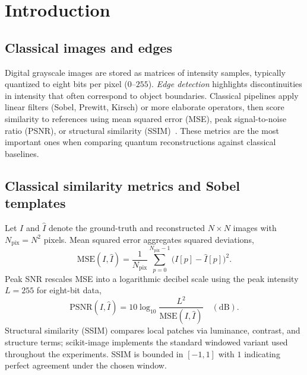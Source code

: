 \chapter{Introduction}\label{ch:introduction}
\thispagestyle{pagestyle}

\section{Classical images and edges}
Digital grayscale images are stored as matrices of intensity samples, typically quantized to eight bits per pixel ($0$--$255$). \emph{Edge detection} highlights discontinuities in intensity that often correspond to object boundaries. Classical pipelines apply linear filters (Sobel, Prewitt, Kirsch) or more elaborate operators, then score similarity to references using mean squared error (MSE), peak signal-to-noise ratio (PSNR), or structural similarity (SSIM)~\cite{Zhang2015QSobel,Zhou2019PrewittNEQR,Xu2020Kirsch}. These metrics are the most important ones when comparing quantum reconstructions against classical baselines.

\section{Classical similarity metrics and Sobel templates}
Let $I$ and $\hat{I}$ denote the ground-truth and reconstructed $N\times N$ images with $N_{\mathrm{pix}}=N^2$ pixels. Mean squared error aggregates squared deviations,
\begin{equation}
\mathrm{MSE}(I,\hat{I}) = \frac{1}{N_{\mathrm{pix}}}\sum_{p=0}^{N_{\mathrm{pix}}-1}\bigl(I[p]-\hat{I}[p]\bigr)^2 .
\end{equation}
Peak SNR rescales MSE into a logarithmic decibel scale using the peak intensity $L=255$ for eight-bit data,
\begin{equation}
\mathrm{PSNR}(I,\hat{I}) = 10\log_{10}\frac{L^2}{\mathrm{MSE}(I,\hat{I})}\quad(\mathrm{dB}).
\end{equation}
Structural similarity (SSIM) compares local patches via luminance, contrast, and structure terms; scikit-image implements the standard windowed variant used throughout the experiments. SSIM is bounded in $[-1,1]$ with $1$ indicating perfect agreement under the chosen window.

